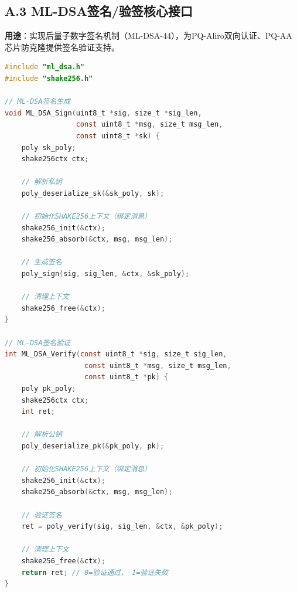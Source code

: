 \subsection*{A.3 ML-DSA签名/验签核心接口}
\textbf{用途}：实现后量子数字签名机制（ML-DSA-44），为PQ-Aliro双向认证、PQ-AA芯片防克隆提供签名验证支持。
\begin{lstlisting}[language=C, caption=ML-DSA核心接口实现]
#include "ml_dsa.h"
#include "shake256.h"

// ML-DSA签名生成
void ML_DSA_Sign(uint8_t *sig, size_t *sig_len, 
                 const uint8_t *msg, size_t msg_len, 
                 const uint8_t *sk) {
    poly sk_poly;
    shake256ctx ctx;
    
    // 解析私钥
    poly_deserialize_sk(&sk_poly, sk);
    
    // 初始化SHAKE256上下文（绑定消息）
    shake256_init(&ctx);
    shake256_absorb(&ctx, msg, msg_len);
    
    // 生成签名
    poly_sign(sig, sig_len, &ctx, &sk_poly);
    
    // 清理上下文
    shake256_free(&ctx);
}

// ML-DSA签名验证
int ML_DSA_Verify(const uint8_t *sig, size_t sig_len, 
                   const uint8_t *msg, size_t msg_len, 
                   const uint8_t *pk) {
    poly pk_poly;
    shake256ctx ctx;
    int ret;
    
    // 解析公钥
    poly_deserialize_pk(&pk_poly, pk);
    
    // 初始化SHAKE256上下文（绑定消息）
    shake256_init(&ctx);
    shake256_absorb(&ctx, msg, msg_len);
    
    // 验证签名
    ret = poly_verify(sig, sig_len, &ctx, &pk_poly);
    
    // 清理上下文
    shake256_free(&ctx);
    return ret; // 0=验证通过，-1=验证失败
}
\end{lstlisting}

